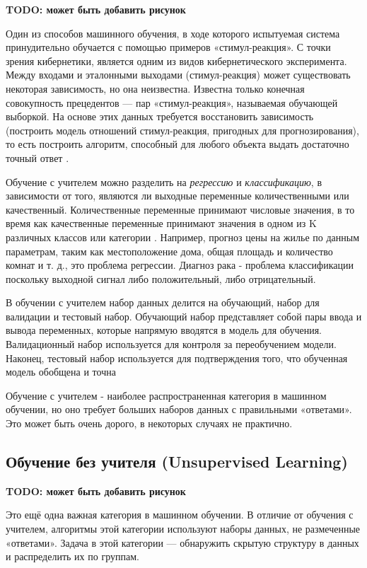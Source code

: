 \textbf{TODO: может быть добавить рисунок}

Один из способов машинного обучения, в ходе которого испытуемая система принудительно обучается с помощью примеров «стимул-реакция». С точки зрения кибернетики, является одним из видов кибернетического эксперимента. Между входами и эталонными выходами (стимул-реакция) может существовать некоторая зависимость, но она неизвестна. Известна только конечная совокупность прецедентов — пар «стимул-реакция», называемая обучающей выборкой. На основе этих данных требуется восстановить зависимость (построить модель отношений стимул-реакция, пригодных для прогнозирования), то есть построить алгоритм, способный для любого объекта выдать достаточно точный ответ \cite{james2014introduction}.

Обучение с учителем можно разделить на \textit{регрессию} и \textit{классификацию}, в зависимости от того, являются ли выходные переменные количественными или качественный. Количественные переменные принимают числовые значения, в то время как качественные переменные принимают значения в одном из K различных классов или категории \cite{james2014introduction}. Например, прогноз цены на жилье по данным параметрам, таким как местоположение дома, общая площадь и количество комнат и т. д., это проблема регрессии. Диагноз рака - проблема классификации поскольку выходной сигнал либо положительный, либо отрицательный.

В обучении с учителем набор данных делится на обучающий, набор для валидации и тестовый набор. Обучающий набор представляет собой пары ввода и вывода переменных, которые напрямую вводятся в модель для обучения. Валидационный набор используется для контроля за переобучением модели. Наконец, тестовый набор используется для подтверждения того, что обученная модель обобщена и точна

Обучение с учителем - наиболее распространенная категория в машинном обучении, но оно требует больших наборов данных с правильными «ответами». Это может быть очень дорого, в некоторых случаях не практично.


\subsection{Обучение без учителя (Unsupervised Learning)}
\textbf{TODO: может быть добавить рисунок}

Это ещё одна важная категория в машинном обучении.
В отличие от обучения с учителем, алгоритмы этой категории используют наборы данных, не размеченные «ответами». Задача в этой категории --- обнаружить скрытую структуру в данных и распределить их по группам.

